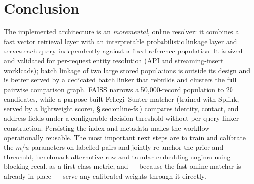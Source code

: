 \documentclass[11pt]{article}
\begin{document}
\section{Conclusion}
The implemented architecture is an \emph{incremental}, online resolver: it combines a fast vector retrieval layer with an interpretable probabilistic linkage layer and serves each query independently against a fixed reference population. It is sized and validated for per-request entity resolution (API and streaming-insert workloads); batch linkage of two large stored populations is outside its design and is better served by a dedicated batch linker that rebuilds and clusters the full pairwise comparison graph. FAISS narrows a 50,000-record population to 20 candidates, while a purpose-built Fellegi--Sunter matcher (trained with Splink, served by a lightweight scorer, §\ref{sec:online-fs}) compares identity, contact, and address fields under a configurable decision threshold without per-query linker construction. Persisting the index and metadata makes the workflow operationally reusable. The most important next steps are to train and calibrate the $m/u$ parameters on labelled pairs and jointly re-anchor the prior and threshold, benchmark alternative row and tabular embedding engines using blocking recall as a first-class metric, and --- because the fast online matcher is already in place --- serve any calibrated weights through it directly.
\end{document}

